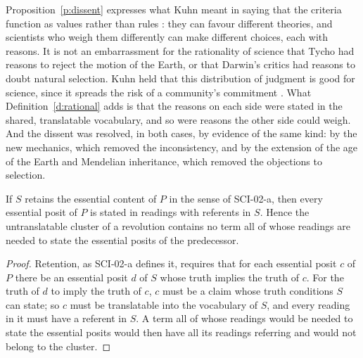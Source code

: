 \documentclass{situationist-preprint}
\begin{document}
Proposition~\ref{p:dissent} expresses what Kuhn meant in saying that the criteria function as values rather than rules \citep{Kuhn1977}: they can favour different theories, and scientists who weigh them differently can make different choices, each with reasons. It is not an embarrassment for the rationality of science that Tycho had reasons to reject the motion of the Earth, or that Darwin's critics had reasons to doubt natural selection. Kuhn held that this distribution of judgment is good for science, since it spreads the risk of a community's commitment \citep{Kuhn1977}. What Definition~\ref{d:rational} adds is that the reasons on each side were stated in the shared, translatable vocabulary, and so were reasons the other side could weigh. And the dissent was resolved, in both cases, by evidence of the same kind: by the new mechanics, which removed the inconsistency, and by the extension of the age of the Earth and Mendelian inheritance, which removed the objections to selection.

\begin{proposition}\label{p:retention}
If $S$ retains the essential content of $P$ in the sense of SCI-02-a, then every essential posit of $P$ is stated in readings with referents in $S$. Hence the untranslatable cluster of a revolution contains no term all of whose readings are needed to state the essential posits of the predecessor.
\end{proposition}

\begin{proof}
Retention, as SCI-02-a defines it, requires that for each essential posit $c$ of $P$ there be an essential posit $d$ of $S$ whose truth implies the truth of $c$. For the truth of $d$ to imply the truth of $c$, $c$ must be a claim whose truth conditions $S$ can state; so $c$ must be translatable into the vocabulary of $S$, and every reading in it must have a referent in $S$. A term all of whose readings would be needed to state the essential posits would then have all its readings referring and would not belong to the cluster.
\end{proof}
\end{document}
